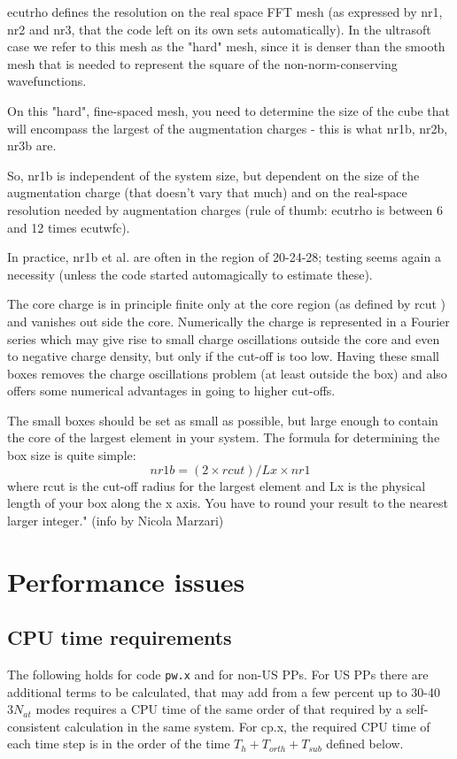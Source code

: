 \documentclass[12pt,a4paper]{article}
\def\pw.x{\texttt{pw.x}}
\begin{document}
ecutrho defines the resolution on the real space FFT mesh (as expressed 
by nr1, nr2 and nr3, that the code left on its own sets automatically).
In the ultrasoft case we refer to this mesh as the "hard" mesh, since it 
is denser than the smooth mesh that is needed to represent the square 
of the non-norm-conserving wavefunctions.
  
On this "hard", fine-spaced mesh, you need to determine the size of the
cube that will encompass the largest of the augmentation charges - this
is what nr1b, nr2b, nr3b are.
  
So, nr1b is independent of the system size, but dependent on the size
of the augmentation charge (that doesn't vary that much) and on the
real-space resolution needed by augmentation charges (rule of thumb:
ecutrho is between 6 and 12 times ecutwfc).

In practice, nr1b et al. are often in the region of 20-24-28; testing seems
again a necessity (unless the code started automagically to estimate these).

The core charge is in principle finite only at the core region (as defined
by rcut ) and vanishes out side the core. Numerically the charge is
represented in a Fourier series which may give rise to small charge
oscillations outside the core and even to negative charge density, but
only if the cut-off is too low. Having these small boxes removes the
charge oscillations problem (at least outside the box) and also offers
some numerical advantages in going to higher cut-offs.

The small boxes should be set as small as possible, but large enough
to contain the core of the largest element in your system.
The formula for determining the box size is quite simple: 
$$
   nr1b = (2 \times rcut )/Lx \times nr1
$$
where rcut is the cut-off radius for the largest element and Lx is the
physical length of your box along the x axis. You have to round your
result to the nearest larger integer." (info by Nicola Marzari)

\section{Performance issues}

\subsection{CPU time requirements}

The following holds for code \pw.x and for non-US PPs. For US PPs there
are additional terms to be calculated, that may add from a few percent 
up to 30-40%
$3N_{at}$ modes requires a CPU time of the same order of that required by a
self-consistent calculation in the same system. For cp.x, the required CPU 
time of each time step is in the order of the time $T_h + T_{orth} + T_{sub}$ 
defined below.
\end{document}
